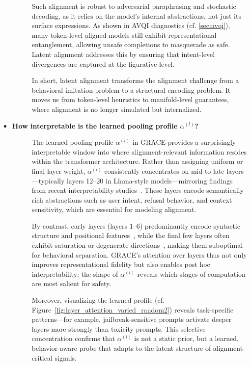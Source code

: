 \begin{itemize}[leftmargin=15pt,nolistsep]
\begin{description}
\medskip
Such alignment is robust to adversarial paraphrasing and stochastic decoding, as it relies on the model’s internal abstractions, not just its surface expressions. As shown in AVQI diagnostics (cf. \cref{sec:avqi}), many token-level aligned models still exhibit representational entanglement, allowing unsafe completions to masquerade as safe. Latent alignment addresses this by ensuring that intent-level divergences are captured at the figurative level.

\medskip
In short, latent alignment transforms the alignment challenge from a behavioral imitation problem to a structural encoding problem. It moves us from token-level heuristics to manifold-level guarantees, where alignment is no longer simulated but internalized.

\end{description}


\item[\ding{93}] { \selectfont \textbf{How interpretable is the learned pooling profile $\alpha^{(l)}$?}}
\begin{description}
\item[] 
The learned pooling profile $\alpha^{(l)}$ in GRACE provides a surprisingly interpretable window into where alignment-relevant information resides within the transformer architecture. Rather than assigning uniform or final-layer weight, $\alpha^{(l)}$ consistently concentrates on mid-to-late layers—typically layers 12–20 in Llama-style models—mirroring findings from recent interpretability studies~\citep{belrose2023language, mu2023layers}. These layers encode semantically rich abstractions such as user intent, refusal behavior, and context sensitivity, which are essential for modeling alignment. 

By contrast, early layers (layers 1–6) predominantly encode syntactic structure and positional features~\citep{elhage2021mechanistic}, while the final few layers often exhibit saturation or degenerate directions~\citep{dong2021attention}, making them suboptimal for behavioral separation. GRACE’s attention over layers thus not only improves representational fidelity but also enables post hoc interpretability: the shape of $\alpha^{(l)}$ reveals which stages of computation are most salient for safety.

Moreover, visualizing the learned profile (cf. Figure~\ref{fig:layer_attention_varied_random2}) reveals task-specific patterns—for example, jailbreak-sensitive prompts activate deeper layers more strongly than toxicity prompts. This selective concentration confirms that $\alpha^{(l)}$ is not a static prior, but a learned, behavior-aware probe that adapts to the latent structure of alignment-critical signals.
\end{description}



\end{itemize}
